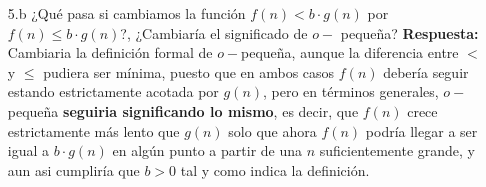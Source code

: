 \documentclass[12pt]{article}
\begin{document}
\begin{itemize}
\begin{itemize}
        \end{itemize}
    \item[5.b] ¿Qué pasa si cambiamos la función $f(n) < b \cdot g(n)$ por $f(n) \leq b \cdot g(n)$?, ¿Cambiaría el significado de $o-$ pequeña?
    \textbf{Respuesta:}\\
    Cambiaria la definición formal de $o-$pequeña, aunque la diferencia entre $<$ y $\leq$ pudiera ser mínima, puesto que en ambos casos $f(n)$ debería seguir estando estrictamente acotada por $g(n)$, pero en términos generales, $o-$pequeña \textbf{seguiria significando lo mismo}, es decir, que $f(n)$ crece estrictamente más lento que $g(n)$ solo que ahora $f(n)$ podría llegar a ser igual a $b \cdot g(n)$ en algún punto a partir de una $n$ suficientemente grande, y aun asi cumpliría que $b > 0$ tal y como indica la definición.\\

\end{itemize}

\end{document}
